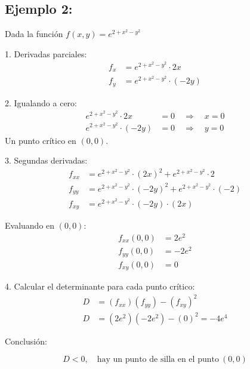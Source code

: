     \subsection{Ejemplo 2:} \cite{matefacil2020}

        Dada la función $f(x, y) = e^{2 + x^2 - y^2}$  \vspace{0.2cm}

        1. Derivadas parciales:
        \begin{align*}
            f_x &= e^{2 + x^2 - y^2} \cdot 2x \\
            f_y &= e^{2 + x^2 - y^2} \cdot (-2y)
        \end{align*}
        
        2. Igualando a cero:
        \begin{align*}
            e^{2 + x^2 - y^2} \cdot 2x &= 0 \quad \Rightarrow \quad x = 0 \\
            e^{2 + x^2 - y^2} \cdot (-2y) &= 0 \quad \Rightarrow \quad y = 0
        \end{align*}
        Un punto crítico en $(0, 0)$.  \vspace{0.2cm}
        
        3. Segundas derivadas:
        \begin{align*}
            f_{xx} &= e^{2 + x^2 - y^2} \cdot (2x)^2 + e^{2 + x^2 - y^2} \cdot 2 \\
            f_{yy} &= e^{2 + x^2 - y^2} \cdot (-2y)^2 + e^{2 + x^2 - y^2} \cdot (-2) \\
            f_{xy} &= e^{2 + x^2 - y^2} \cdot (-2y) \cdot (2x)
        \end{align*}
        
        Evaluando en $(0, 0)$:
        \begin{align*}
            f_{xx}(0, 0) &= 2e^2 \\
            f_{yy}(0, 0) &= -2e^2 \\
            f_{xy}(0, 0) &= 0
        \end{align*}
        
        4. Calcular el determinante para cada punto crítico:
        \begin{align*}
            D &= (f_{xx})(f_{yy}) - (f_{xy})^2 \\
            D &= (2e^2)(-2e^2) - (0)^2 = -4e^4
        \end{align*}
        
        Conclusión:
        
        \[ D < 0, \quad \text{hay un punto de silla en el punto} \ (0, 0) \]
         \vspace{0.2cm}

